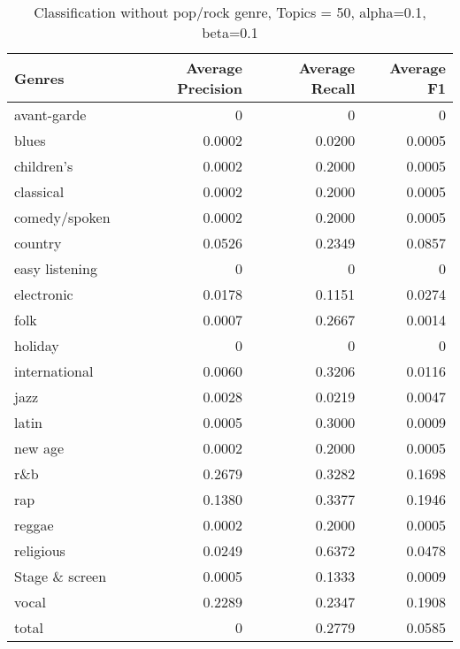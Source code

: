 \begin{table}[h]
\begin{tabular}{|l|r|r|r|}

\hline
\textbf{Genres} &  \textbf{Average Precision} & \textbf{Average Recall} & \textbf{Average F1} \\
\hline
avant-garde & 0 & 	0&	0\\
blues & 0.0002&	0.0200&	0.0005\\
children's & 0.0002&	0.2000	&0.0005\\
classical  & 0.0002	&0.2000&	0.0005\\
comedy/spoken & 0.0002&	0.2000	&0.0005\\
country  & 0.0526&	0.2349&	0.0857\\
easy listening & 0&	0&	0\\
electronic & 0.0178&	0.1151&	0.0274\\
folk & 0.0007&	0.2667	&0.0014\\
holiday & 0&	0&	0\\
international & 0.0060&	0.3206	&0.0116\\
jazz & 0.0028	&0.0219&	0.0047\\
latin & 0.0005&	0.3000&	0.0009\\
new age & 0.0002&	0.2000	&0.0005\\
r\&b & 0.2679&	0.3282&	0.1698\\
rap & 0.1380&	0.3377&	0.1946\\
reggae & 0.0002&	0.2000&	0.0005\\
religious & 0.0249&	0.6372&	0.0478\\
Stage \& screen & 0.0005	&0.1333	&0.0009\\
vocal & 0.2289	&0.2347	&0.1908\\
total& 0	&0.2779&	0.0585\\
\hline
\end{tabular}
\caption{Classification without pop/rock genre, Topics = 50, alpha=0.1, beta=0.1}
\end{table}